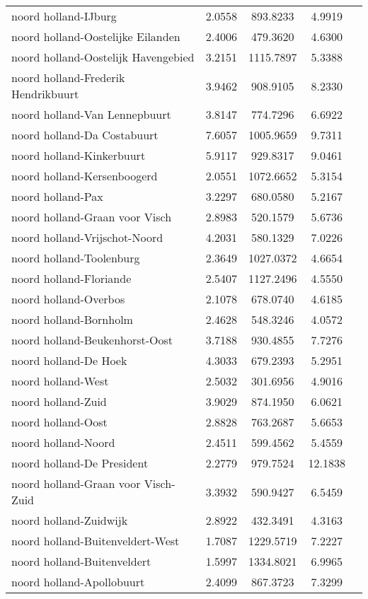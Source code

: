 \begin{longtable}{llccc}
noord holland-IJburg & 2.0558 & 893.8233 & 4.9919 \\
noord holland-Oostelijke Eilanden & 2.4006 & 479.3620 & 4.6300 \\
noord holland-Oostelijk Havengebied & 3.2151 & 1115.7897 & 5.3388 \\
noord holland-Frederik Hendrikbuurt & 3.9462 & 908.9105 & 8.2330 \\
noord holland-Van Lennepbuurt & 3.8147 & 774.7296 & 6.6922 \\
noord holland-Da Costabuurt & 7.6057 & 1005.9659 & 9.7311 \\
noord holland-Kinkerbuurt & 5.9117 & 929.8317 & 9.0461 \\
noord holland-Kersenboogerd & 2.0551 & 1072.6652 & 5.3154 \\
noord holland-Pax & 3.2297 & 680.0580 & 5.2167 \\
noord holland-Graan voor Visch & 2.8983 & 520.1579 & 5.6736 \\
noord holland-Vrijschot-Noord & 4.2031 & 580.1329 & 7.0226 \\
noord holland-Toolenburg & 2.3649 & 1027.0372 & 4.6654 \\
noord holland-Floriande & 2.5407 & 1127.2496 & 4.5550 \\
noord holland-Overbos & 2.1078 & 678.0740 & 4.6185 \\
noord holland-Bornholm & 2.4628 & 548.3246 & 4.0572 \\
noord holland-Beukenhorst-Oost & 3.7188 & 930.4855 & 7.7276 \\
noord holland-De Hoek & 4.3033 & 679.2393 & 5.2951 \\
noord holland-West & 2.5032 & 301.6956 & 4.9016 \\
noord holland-Zuid & 3.9029 & 874.1950 & 6.0621 \\
noord holland-Oost & 2.8828 & 763.2687 & 5.6653 \\
noord holland-Noord & 2.4511 & 599.4562 & 5.4559 \\
noord holland-De President & 2.2779 & 979.7524 & 12.1838 \\
noord holland-Graan voor Visch-Zuid & 3.3932 & 590.9427 & 6.5459 \\
noord holland-Zuidwijk & 2.8922 & 432.3491 & 4.3163 \\
noord holland-Buitenveldert-West & 1.7087 & 1229.5719 & 7.2227 \\
noord holland-Buitenveldert & 1.5997 & 1334.8021 & 6.9965 \\
noord holland-Apollobuurt & 2.4099 & 867.3723 & 7.3299 \\

\end{longtable}
